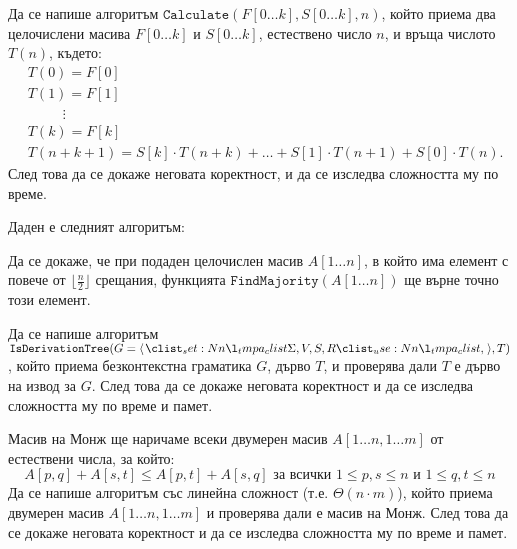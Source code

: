 \begin{problem}
Да се напише алгоритъм $\mathtt{Calculate}(F[0 \dots k], S[0 \dots k], n)$, който приема два целочислени масива $F[0 \dots k]$ и $S[0 \dots k]$, естествено число $n$, и връща числото $T(n)$, където:
\begin{align*}
     & T(0) = F[0]                                                                         \\
     & T(1) = F[1]                                                                         \\
     & \phantom{00000} \vdots                                                              \\
     & T(k) = F[k]                                                                         \\
     & T(n + k + 1) = S[k] \cdot T(n + k) + \dots + S[1] \cdot T(n + 1) + S[0] \cdot T(n).
\end{align*}
След това да се докаже неговата коректност, и да се изследва сложността му по време.
\end{problem}

\newpage

\begin{problem}
Даден е следният алгоритъм:


Да се докаже, че при подаден целочислен масив $A[1 \dots n]$, в който има елемент с повече от $\lfloor \frac{n}{2} \rfloor$ срещания,
функцията $\mathtt{FindMajority}(A[1 \dots n])$ ще върне точно този елемент.
\end{problem}

\begin{problem}
Да се напише алгоритъм $\mathtt{IsDerivationTree}(G = \opair{\Sigma, V, S, R}, T)$, който приема безконтекстна граматика $G$, дърво $T$, и проверява дали $T$ е дърво на извод за $G$.
След това да се докаже неговата коректност и да се изследва сложността му по време и памет.
\end{problem}

\begin{problem}
Масив на Монж ще наричаме всеки двумерен масив $A[1 \dots n, 1 \dots m]$ от естествени числа, за който:
\[
    A[p, q] + A[s, t] \leq A[p, t] + A[s, q] \text{ за всички } 1 \leq p, s \leq n \text{ и } 1 \leq q, t \leq n
\]
Да се напише алгоритъм със линейна сложност (т.е. $\Theta(n \cdot m)$), който приема двумерен масив $A[1 \dots n, 1 \dots m]$ и проверява дали е масив на Монж.
След това да се докаже неговата коректност и да се изследва сложността му по време и памет.
\end{problem}

